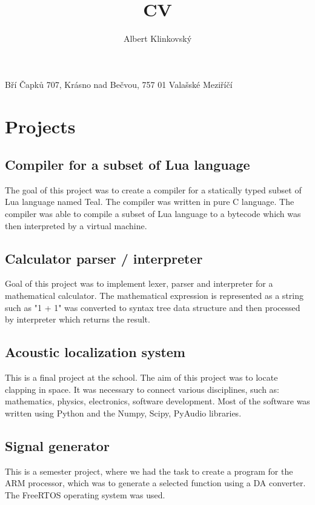\documentclass{article}
\renewcommand{\maketitle}{
    \begin{center}
        \Huge\bfseries
        \theauthor

    \end{center}
    \begin{center}
        Bří Čapků 707, Krásno nad Bečvou, 757 01 Valašské Meziříčí
    \end{center}
}
\begin{document}
\title{CV}
\author{Albert Klinkovský}

\maketitle



\section{Projects}


\subsection{Compiler for a subset of Lua language}

The goal of this project was to create a compiler for a statically typed subset of Lua language named Teal. The compiler
was written in pure C language. The compiler was able to compile a subset of Lua language to a bytecode which was then
interpreted by a virtual machine.

\subsection{Calculator parser / interpreter}

Goal of this project was to implement lexer, parser and interpreter for a mathematical calculator. The mathematical
expression is represented as a string such as "1 + 1" was converted to syntax tree data structure and then processed
by interpreter which returns the result.

\subsection{Acoustic localization system}

This is a final project at the school. The aim of this project was to locate clapping in space.  It was necessary to
connect various disciplines, such as:  mathematics, physics, electronics, software development. Most of the software
was written using Python and the Numpy, Scipy, PyAudio libraries.

\subsection{Signal generator}

This is a semester project, where we had the task to create a program for the ARM processor, which was to generate a
selected function using a DA converter.  The FreeRTOS operating system was used.
\end{document}
